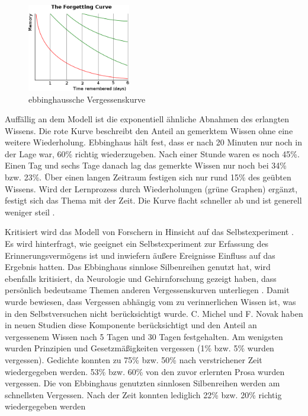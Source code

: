 \begin{figure}[ht!]
    \centering
    \includegraphics[width=0.4\textwidth]{images/vergessenskurve.png}
    \caption{ebbinghaussche Vergessenskurve \protect}
    \label{fig:curve}
\end{figure}

Auffällig an dem Modell ist die exponentiell ähnliche Abnahmen des erlangten Wissens. Die rote Kurve beschreibt den Anteil an gemerktem Wissen ohne eine weitere Wiederholung. Ebbinghaus hält fest, dass er nach 20 Minuten nur noch in der Lage war, 60\% richtig wiederzugeben. Nach einer Stunde waren es noch 45\%. Einen Tag und sechs Tage danach lag das gemerkte Wissen nur noch bei 34\% bzw. 23\%. Über einen langen Zeitraum festigen sich nur rund 15\% des geübten Wissens. Wird der Lernprozess durch Wiederholungen (grüne Graphen) ergänzt, festigt sich das Thema mit der Zeit. Die Kurve flacht schneller ab und ist generell weniger steil \cite{Wiki:Vergessenskurve}.

Kritisiert wird das Modell von Forschern in Hinsicht auf das Selbstexperiment \cite{Wiki:Vergessenskurve}. Es wird hinterfragt, wie geeignet ein Selbstexperiment zur Erfassung des Erinnerungsvermögens ist und inwiefern äußere Ereignisse Einfluss auf das Ergebnis hatten. Das Ebbinghaus sinnlose Silbenreihen genutzt hat, wird ebenfalls kritisiert, da Neurologie und Gehirnforschung gezeigt haben, dass persönlich bedeutsame Themen anderen Vergessenskurven unterliegen \cite{Wiki:Vergessenskurve}. Damit wurde bewiesen, dass Vergessen abhängig vom zu verinnerlichen Wissen ist, was in den Selbstversuchen nicht berücksichtigt wurde. C. Michel und F. Novak haben in neuen Studien \cite{Wiki:Vergessenskurve} diese Komponente berücksichtigt und den Anteil an vergessenem Wissen nach 5 Tagen und 30 Tagen festgehalten. Am wenigsten wurden Prinzipien und Gesetzmäßigkeiten vergessen (1\% bzw. 5\% wurden vergessen). Gedichte konnten zu 75\% bzw. 50\% nach verstrichener Zeit wiedergegeben werden. 53\% bzw. 60\% von den zuvor erlernten Prosa wurden vergessen. Die von Ebbinghaus genutzten sinnlosen Silbenreihen werden am schnellsten Vergessen. Nach der Zeit konnten lediglich 22\% bzw. 20\% richtig wiedergegeben werden \cite{Wiki:Vergessenskurve}

